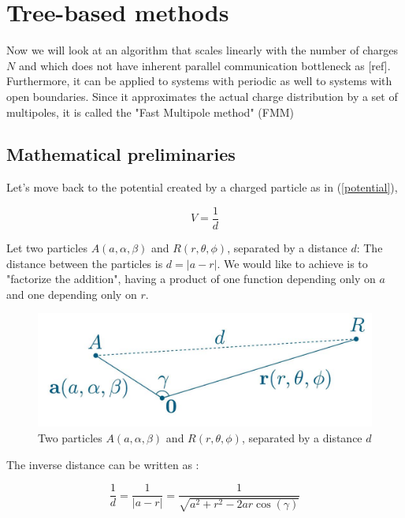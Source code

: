 \documentclass[12pt,twoside,a4paper]{report}
\begin{document}
\section{Tree-based methods}

Now we will look at an algorithm that scales linearly with the number of charges $N$ and which does not have inherent parallel communication bottleneck as [ref].
Furthermore, it can be applied to systems with periodic as well to systems with open boundaries. Since it approximates the actual charge distribution by a set of multipoles, it is called the "Fast Multipole method" (FMM)
    
	\subsection{Mathematical preliminaries}
	
	Let's move back to the potential created by a charged particle as in (\ref{potential}),
	
	\begin{equation*}
	V = \frac{1}{d}
	\end{equation*}
	
	Let two particles $A(a,\alpha,\beta)$ and $R(r,\theta,\phi)$, separated by a distance $d$: The distance between the particles is $d = |a - r|$.
	We would like to achieve is to "factorize the addition", having a product of one function depending only on $a$ and one depending only on $r$.
	
	
\begin{figure}[H]
\includegraphics[scale=0.4]{distance}
 \centering 
\caption{Two particles $A(a,\alpha,\beta)$ and $R(r,\theta,\phi)$, separated by a distance $d$}
\label{fig:poster}
\end{figure}	
	
	
	The inverse distance can be written as :
	
	\begin{equation*}
		\frac{1}{d} = \frac{1}{|a-r|} = \frac{1}{\sqrt{a^2 + r^2 - 2ar \cos(\gamma)}}
	\end{equation*}
\end{document}
